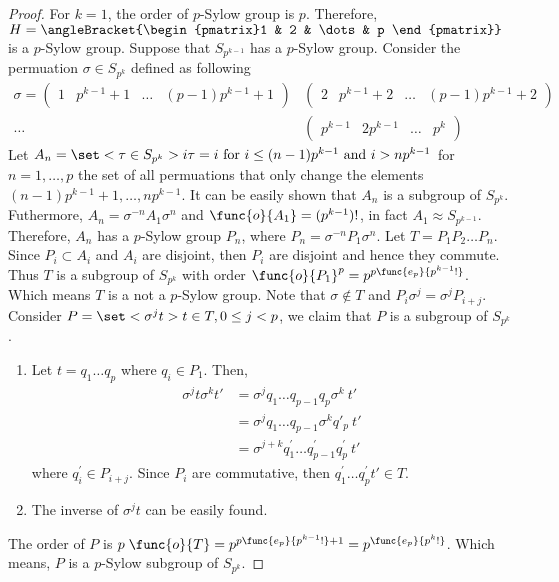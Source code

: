 \begin{proof}
    For \(k = 1\), the order of \(p\)-Sylow group is \(p\). Therefore, \(H = \angleBracket{\begin{pmatrix}1 & 2 & \dots & p \end{pmatrix}}\) is a \(p\)-Sylow group.
    Suppose that \(S_{p^{k-1}}\) has a \(p\)-Sylow group. Consider the permuation \(\sigma \in S_{p^k}\) defined as following 
    \begin{align*}
        \sigma = \begin{pmatrix}
            1 & p^{k-1} + 1 & \dots & (p-1)p^{k-1} + 1
        \end{pmatrix} & \begin{pmatrix}
            2 & p^{k-1} + 2 & \dots & (p-1)p^{k-1} + 2
        \end{pmatrix} \\
        \dots& \begin{pmatrix}
            p^{k-1} & 2 p^{k-1} & \dots & p^k
        \end{pmatrix}
    \end{align*}
    Let \(A_n = \set<\tau \in S_{p^k}>{i \tau = i \text{ for } i \leq (n-1)p^{k-1}  \text{ and } i > np^{k-1}}\) for \(n = 1, \dots,p \) the set of all permuations that only change the elements \((n-1)p^{k-1} + 1, \dots,np^{k-1}\). It can be easily shown that \(A_n\) is a subgroup of \(S_{p^k}\). Futhermore, \(A_n = \sigma^{-n} A_1 \sigma^{n}\) and \(\func{o}{A_1} = (p^{k-1})!\), in fact \(A_1 \approx S_{p^{k-1}}\). Therefore, \(A_n\) has a \(p\)-Sylow group \(P_n\), where \(P_n = \sigma^{-n} P_1 \sigma^{n}\). Let \(T = P_1 P_2 \dots P_n\). Since \(P_i \subset A_i\) and \(A_i\) are disjoint, then \(P_i\) are disjoint and hence they commute. Thus \(T\) is a subgroup of \(S_{p^k}\) with order \(\func{o}{P_1}^p = p^{p\func{e_p}{p^{k-1}!}}\). Which means \(T\) is a not a \(p\)-Sylow group. Note that \(\sigma \notin T\) and \(P_{i}\sigma^j = \sigma^j P_{i+j}\). Consider \(P = \set<\sigma^j t>{t \in T, 0 \leq j < p}\), we claim that \(P\) is a subgroup of \(S_{p^k}\). 
    \begin{enumerate}
        \item Let \(t = q_1 \dots q_p\) where \(q_i \in P_1\). Then, 
        \begin{align*}
            \sigma^{j} t \sigma^{k} t' &= \sigma^{j}  q_1 \dots q_{p-1} q_p \sigma^{k}\ t'\\
            &= \sigma^{j}  q_1 \dots q_{p-1} \sigma^{k} q'_p\  t'\\
            &= \sigma^{j+k}  q_1^{'} \dots q_{p-1}^{'}  q_p^{'} \ t'
        \end{align*}
        where \(q_i^{'} \in P_{i + j}\). Since \(P_i\) are commutative, then \(  q_1^{'} \dots  q_p^{'}  t' \in T\).
        \item The inverse of \(\sigma^j t\) can be easily found.
    \end{enumerate}
    The order of \(P\) is \(p\; \func{o}{T} = p^{p\func{e_p}{p^{k-1}!} + 1} = p^{\func{e_p}{p^k!}}\). Which means, \(P\) is a \(p\)-Sylow subgroup of \(S_{p^k}\).
\end{proof}

